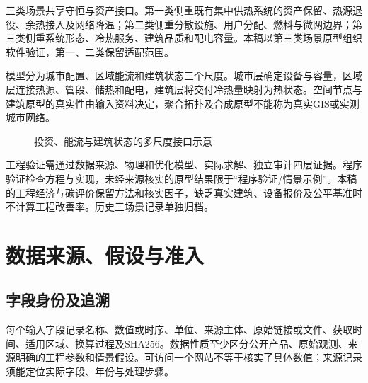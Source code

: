 \documentclass[12pt,a4paper]{article}
\begin{document}
三类场景共享守恒与资产接口。第一类侧重既有集中供热系统的资产保留、热源退役、余热接入及网络降温；第二类侧重分散设施、用户分配、燃料与微网边界；第三类侧重系统形态、冷热服务、建筑品质和配电容量。本稿以第三类场景原型组织软件验证，第一、二类保留适配范围。

模型分为城市配置、区域能流和建筑状态三个尺度。城市层确定设备与容量，区域层连接热源、管段、储热和配电，建筑层将交付冷热量映射为热状态。空间节点与建筑原型的真实性由输入资料决定，聚合拓扑及合成原型不能称为真实GIS或实测城市网络。

\begin{figure}[H]
\centering
{}
\caption{投资、能流与建筑状态的多尺度接口示意}
\label{fig:compact-multiscale}
\end{figure}

工程验证需通过数据来源、物理和优化模型、实际求解、独立审计四层证据。程序验证检查方程与实现，未经来源核实的原型结果限于“程序验证/情景示例”。本稿的工程经济与碳评价保留方法和核实因子，缺乏真实建筑、设备报价及公平基准时不计算工程改善率。历史三场景记录单独归档。

\clearpage
\section{数据来源、假设与准入}

\subsection{字段身份及追溯}

每个输入字段记录名称、数值或时序、单位、来源主体、原始链接或文件、获取时间、适用区域、换算过程及SHA256。数据性质至少区分公开产品、原始观测、来源明确的工程参数和情景假设。可访问一个网站不等于核实了具体数值；来源记录须能定位实际字段、年份与处理步骤。
\end{document}
